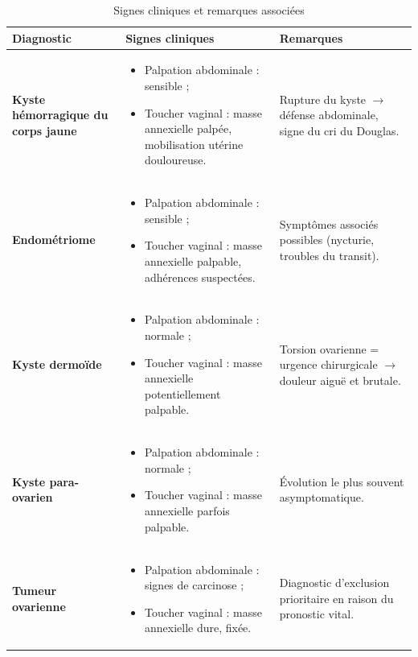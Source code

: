 \begin{table}[htbp]
  \centering
  \caption{Signes cliniques et remarques associées}
  \label{tab:signesCliniques}
  \small
  \begin{tabularx}{\textwidth}{>{\bfseries}p{3cm} X X}
    \toprule
    Diagnostic & Signes cliniques & Remarques \\
    \midrule
    Kyste hémorragique du corps jaune &
    \begin{itemize}[nosep, leftmargin=*]
      \item Palpation abdominale : sensible ;
      \item Toucher vaginal : masse annexielle palpée, mobilisation utérine douloureuse.
    \end{itemize} &
    Rupture du kyste $\rightarrow$ défense abdominale, signe du cri du Douglas. \\
    \addlinespace
    Endométriome &
    \begin{itemize}[nosep, leftmargin=*]
      \item Palpation abdominale : sensible ;
      \item Toucher vaginal : masse annexielle palpable, adhérences suspectées.
    \end{itemize} &
    Symptômes associés possibles (nycturie, troubles du transit). \\
    \addlinespace
    Kyste dermoïde &
    \begin{itemize}[nosep, leftmargin=*]
      \item Palpation abdominale : normale ;
      \item Toucher vaginal : masse annexielle potentiellement palpable.
    \end{itemize} &
    Torsion ovarienne = urgence chirurgicale $\rightarrow$ douleur aiguë et brutale. \\
    \addlinespace
    Kyste para-ovarien &
    \begin{itemize}[nosep, leftmargin=*]
      \item Palpation abdominale : normale ;
      \item Toucher vaginal : masse annexielle parfois palpable.
    \end{itemize} &
    Évolution le plus souvent asymptomatique. \\
    \addlinespace
    Tumeur ovarienne &
    \begin{itemize}[nosep, leftmargin=*]
      \item Palpation abdominale : signes de carcinose ;
      \item Toucher vaginal : masse annexielle dure, fixée.
    \end{itemize} &
    Diagnostic d'exclusion prioritaire en raison du pronostic vital. \\
    \bottomrule
  \end{tabularx}
\end{table}

